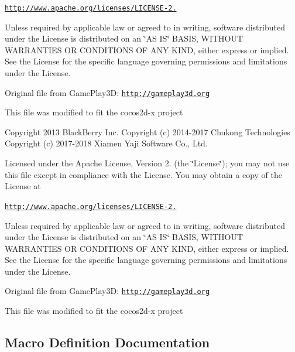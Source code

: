 \href{http://www.apache.org/licenses/LICENSE-2.0}{\tt http\+://www.\+apache.\+org/licenses/\+L\+I\+C\+E\+N\+S\+E-\/2.}

Unless required by applicable law or agreed to in writing, software distributed under the License is distributed on an \char`\"{}\+A\+S I\+S\char`\"{} B\+A\+S\+IS, W\+I\+T\+H\+O\+UT W\+A\+R\+R\+A\+N\+T\+I\+ES OR C\+O\+N\+D\+I\+T\+I\+O\+NS OF A\+NY K\+I\+ND, either express or implied. See the License for the specific language governing permissions and limitations under the License.

Original file from Game\+Play3D\+: \href{http://gameplay3d.org}{\tt http\+://gameplay3d.\+org}

This file was modified to fit the cocos2d-\/x project

Copyright 2013 Black\+Berry Inc. Copyright (c) 2014-\/2017 Chukong Technologies Copyright (c) 2017-\/2018 Xiamen Yaji Software Co., Ltd.

Licensed under the Apache License, Version 2. (the \char`\"{}\+License\char`\"{}); you may not use this file except in compliance with the License. You may obtain a copy of the License at

\href{http://www.apache.org/licenses/LICENSE-2.0}{\tt http\+://www.\+apache.\+org/licenses/\+L\+I\+C\+E\+N\+S\+E-\/2.}

Unless required by applicable law or agreed to in writing, software distributed under the License is distributed on an \char`\"{}\+A\+S I\+S\char`\"{} B\+A\+S\+IS, W\+I\+T\+H\+O\+UT W\+A\+R\+R\+A\+N\+T\+I\+ES OR C\+O\+N\+D\+I\+T\+I\+O\+NS OF A\+NY K\+I\+ND, either express or implied. See the License for the specific language governing permissions and limitations under the License.

Original file from Game\+Play3D\+: \href{http://gameplay3d.org}{\tt http\+://gameplay3d.\+org}

This file was modified to fit the cocos2d-\/x project 

\subsection{Macro Definition Documentation}
\mbox{\label{group__base_gae2eab65745e7f093a97fbd4421261c84}} 
